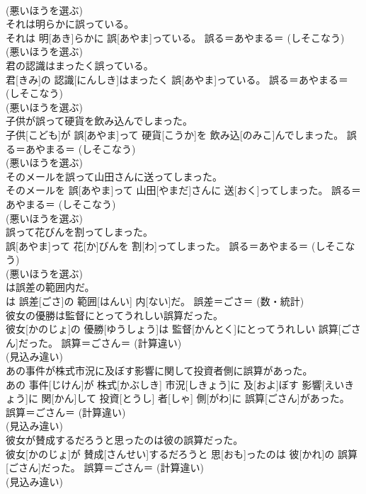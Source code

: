 \documentclass[8pt]{extreport}
\begin{document}
\begin{CJK}{UTF8}{min}
{\\	(悪いほうを選ぶ) 
\\	それは明らかに誤っている。	
\\	それは 明[あき]らかに 誤[あやま]っている。	誤る＝あやまる＝ (しそこなう) 
\\	(悪いほうを選ぶ) 
\\	君の認識はまったく誤っている。	
\\	君[きみ]の 認識[にんしき]はまったく 誤[あやま]っている。	誤る＝あやまる＝ (しそこなう) 
\\	(悪いほうを選ぶ) 
\\	子供が誤って硬貨を飲み込んでしまった。	
\\	子供[こども]が 誤[あやま]って 硬貨[こうか]を 飲み込[のみこ]んでしまった。	誤る＝あやまる＝ (しそこなう) 
\\	(悪いほうを選ぶ) 
\\	そのメールを誤って山田さんに送ってしまった。	
\\	そのメールを 誤[あやま]って 山田[やまだ]さんに 送[おく]ってしまった。	誤る＝あやまる＝ (しそこなう) 
\\	(悪いほうを選ぶ) 
\\	誤って花びんを割ってしまった。	
\\	誤[あやま]って 花[か]びんを 割[わ]ってしまった。	誤る＝あやまる＝ (しそこなう) 
\\	(悪いほうを選ぶ) 
\\	は誤差の範囲内だ。	
\\	[ぱーせんと]は 誤差[ごさ]の 範囲[はんい] 内[ない]だ。	誤差＝ごさ＝ (数・統計) 
\\	彼女の優勝は監督にとってうれしい誤算だった。	
\\	彼女[かのじょ]の 優勝[ゆうしょう]は 監督[かんとく]にとってうれしい 誤算[ごさん]だった。	誤算＝ごさん＝ (計算違い) 
\\	(見込み違い) 
\\	あの事件が株式市況に及ぼす影響に関して投資者側に誤算があった。	
\\	あの 事件[じけん]が 株式[かぶしき] 市況[しきょう]に 及[およ]ぼす 影響[えいきょう]に 関[かん]して 投資[とうし] 者[しゃ] 側[がわ]に 誤算[ごさん]があった。	誤算＝ごさん＝ (計算違い) 
\\	(見込み違い) 
\\	彼女が賛成するだろうと思ったのは彼の誤算だった。	
\\	彼女[かのじょ]が 賛成[さんせい]するだろうと 思[おも]ったのは 彼[かれ]の 誤算[ごさん]だった。	誤算＝ごさん＝ (計算違い) 
\\	(見込み違い) 
}
\end{CJK}
\end{document}
